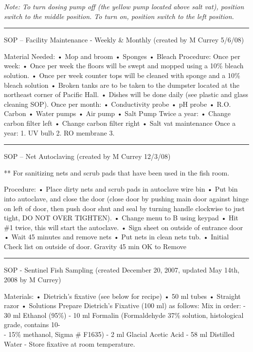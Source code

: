 \documentclass[
]{book}
\begin{document}
\emph{Note: To turn dosing pump off (the yellow pump located above salt vat), position switch to the middle position. To turn on, position switch to the left position.}

\begin{center}\rule{0.5\linewidth}{0.5pt}\end{center}

SOP -- Facility Maintenance - Weekly \& Monthly
(created by M Currey 5/6/08)

Material Needed:
• Mop and broom
• Sponges
• Bleach
Procedure:
Once per week:
• Once per week the floors will be swept and mopped using a 10\% bleach solution.
• Once per week counter tops will be cleaned with sponge and a 10\% bleach solution
• Broken tanks are to be taken to the dumpster located at the northeast corner of Pacific Hall.
• Dishes will be done daily (see plastic and glass cleaning SOP).
Once per month:
• Conductivity probe
• pH probe
• R.O. Carbon
• Water pumps
• Air pump
• Salt Pump
Twice a year:
• Change carbon filter left
• Change carbon filter right
• Salt vat maintenance
Once a year:
1. UV bulb
2. RO membrane
3.

\begin{center}\rule{0.5\linewidth}{0.5pt}\end{center}

SOP -- Net Autoclaving
(created by M Currey 12/3/08)

** For sanitizing nets and scrub pads that have been used in the fish room.

Procedure:
• Place dirty nets and scrub pads in autoclave wire bin
• Put bin into autoclave, and close the door (close door by pushing main door against hinge on left of door, then push door shut and seal by turning handle clockwise to just tight, DO NOT OVER TIGHTEN).
• Change menu to B using keypad
• Hit \#1 twice, this will start the autoclave.
• Sign sheet on outside of entrance door
• Wait 45 minutes and remove nets
• Put nets in clean nets tub.
• Initial Check list on outside of door. Gravity 45 min OK to Remove

\begin{center}\rule{0.5\linewidth}{0.5pt}\end{center}

SOP - Sentinel Fish Sampling
(created December 20, 2007, updated May 14th, 2008 by M Currey)

Materials:
• Dietrich's fixative (see below for recipe)
• 50 ml tubes
• Straight razor
• Solutions
Prepare Dietrich's Fixative (100 ml) as follows:
Mix in order:
- 30 ml Ethanol (95\%)
- 10 ml Formalin (Formaldehyde 37\% solution, histological grade, contains 10-\\
- 15\% methanol, Sigma \# F1635)
- 2 ml Glacial Acetic Acid
- 58 ml Distilled Water
- Store fixative at room temperature.
\end{document}
